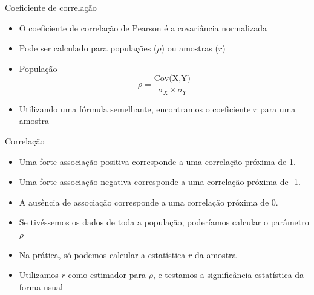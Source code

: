 \documentclass{beamer}
\begin{document}
\begin{frame}{Coeficiente de correlação}
  \begin{itemize}
  \item O coeficiente de correlação de Pearson é a covariância
    normalizada
  \item Pode ser calculado para populações ($\rho$) ou amostras ($r$)
  \item População
    \begin{displaymath}
      \rho = \frac{\text{Cov(X,Y)}}{\sigma_X \times \sigma_Y}
    \end{displaymath}
  \item Utilizando uma fórmula semelhante, encontramos o coeficiente
    $r$ para uma amostra
  \end{itemize}
\end{frame}

\begin{frame}{Correlação}
  \begin{block}{}
    \begin{itemize}
    \item Uma forte associação \alert<2>{positiva} corresponde a uma correlação
      próxima de \alert<2>{1}.
    \item Uma forte associação \alert<3>{negativa} corresponde a uma correlação
      próxima de \alert<3>{-1}.
    \item A \alert<4>{ausência} de associação corresponde a uma
      correlação próxima de \alert<4>{0}.
    \end{itemize}
  \end{block}
\end{frame}

\begin{frame}{}
  \begin{itemize}
  \item Se tivéssemos os dados de toda a população, poderíamos
    calcular o \alert<1>{parâmetro} $\rho$
  \item Na prática, só podemos calcular a \alert<2>{estatística} $r$ da amostra
  \item Utilizamos $r$ como estimador para $\rho$, e testamos a
    significância estatística da forma usual
  \end{itemize}
\end{frame}
\end{document}
